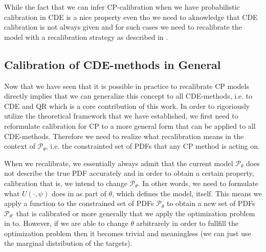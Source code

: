 While the fact that we can infer CP-calibration when we have probabilistic calibration in CDE is a nice property even tho we need to aknowledge that CDE calibration is not always given and for such cases we need to recalibrate the model with a recalibration strategy as described in .

\subsection{Calibration of CDE-methods in General}\label{sec:calibration_cde_general}

Now that we have seen that it is possible in practice to recalibrate CP models  directly implies that we can generalize this concept to all CDE-methods, i.e. to CDE and QR which is a core contribution of this work. In order to rigoriously utilize the theoretical framework that we have established, we first need to reformulate calibration for CP to a more general form that can be applied to all CDE-methods. Therefore we need to realize what recalibration means in the context of $\mathcal{P}_{\theta}$, i.e. the constrainted set of PDFs that any CP method is acting on.

When we recalibrate, we essentially always admit that the current model $\mathcal{P}_{\theta}$ does not describe the true PDF accurately and in order to obtain a certain property, calibration that is, we intend to change $\mathcal{P}_{\theta}$. In other words, we need to formulate what $U(\cdot, \psi)$ does in  as part of $\theta$, which defines the model, itself. This means we apply a function to the constrained set of PDFs $\mathcal{P}_{\theta}$ to obtain a new set of PDFs $\mathcal{P}_{\theta'}$ that is calibrated or more generally that we apply the optimization problem in  to. However, if we are able to change $\theta$ arbitrarely in order to fullfill the optimization problem then it becomes trivial and meaningless (we can just use the marginal distribution of the targets).


